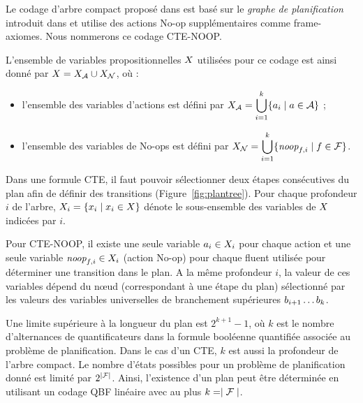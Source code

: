 
Le codage d'arbre compact proposé dans \cite{DBLP:conf/ecai/CashmoreFG12} est basé sur le \textit{graphe de planification} introduit dans \cite{BF97} et utilise des actions No-op supplémentaires comme frame-axiomes. Nous nommerons ce codage CTE-NOOP.

L'ensemble de variables propositionnelles $X$ utilisées pour ce codage est ainsi donné par $X = X_{\mathcal{A}} \cup X_{\mathcal{N}}$, où :
\begin{itemize}
    \item l'ensemble des variables d'actions est défini par $\displaystyle X_{\mathcal{A}}=\bigcup_{i=1}^{k}\{a_{i}\mid a\in\mathcal{A}\}$ ;
    \item l'ensemble des variables de No-ops est défini par $\displaystyle X_{\mathcal{N}}=\bigcup_{i=1}^{k}\{\textit{noop}_{f,i}\mid f\in\mathcal{F}\}$.
\end{itemize}


Dans une formule CTE, il faut pouvoir sélectionner deux étapes consécutives du plan afin de définir des transitions (Figure~\ref{fig:plantree}). Pour chaque profondeur $i$ de l'arbre, $X_i=\{x_i\mid x_i\in X\}$ dénote le sous-ensemble des variables de $X$ indicées par $i$.

Pour CTE-NOOP, il existe une seule variable $a_{i}\in X_{i}$ pour chaque action et une seule variable $\textit{noop}_{f,i}\in X_{i}$ (action No-op) pour chaque fluent utilisée pour déterminer une transition dans le plan. A la même profondeur $i$, la valeur de ces variables dépend du n\oe ud (correspondant à une étape du plan) sélectionné par les valeurs des variables universelles de branchement supérieures $b_{i+1}\ldots b_{k}$. %

Une limite supérieure à la longueur du plan est $2^{k+1}-1$, où $k$ est le nombre d'alternances de quantificateurs dans la formule booléenne quantifiée associée au problème de planification. Dans le cas d'un CTE, $k$ est aussi la profondeur de l'arbre compact. Le nombre d'états possibles pour un problème de planification donné est limité par $2^{\mid \mathcal{F} \mid}$. Ainsi, l'existence d'un plan peut être déterminée en utilisant un codage QBF linéaire avec au plus $k=\mid \mathcal{F} \mid$.



